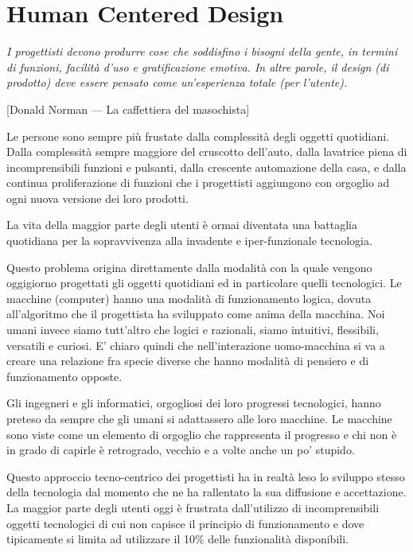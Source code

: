 \chapter{Human Centered Design}

\textit{I progettisti devono produrre cose che soddisfino i bisogni della gente, in termini di funzioni, facilità d’uso e gratificazione emotiva. In altre parole, il design (di prodotto) deve essere pensato come un’esperienza totale (per l'utente).} 

[Donald Norman — La caffettiera del masochista]

Le persone sono sempre più frustate dalla complessità degli oggetti quotidiani. Dalla complessità sempre maggiore del cruscotto dell'auto, dalla lavatrice piena di incomprensibili funzioni e pulsanti, dalla crescente automazione della casa, e dalla continua proliferazione di funzioni che i progettisti aggiungono con orgoglio ad ogni nuova versione dei loro prodotti.

La vita della maggior parte degli utenti è ormai diventata una battaglia quotidiana per la sopravvivenza alla invadente e iper-funzionale tecnologia. %

Questo problema origina direttamente dalla modalità con la quale vengono oggigiorno progettati gli oggetti quotidiani ed in particolare quelli tecnologici. Le macchine (computer) hanno una modalità di funzionamento logica, dovuta all'algoritmo che il progettista ha sviluppato come anima della macchina. Noi umani invece siamo tutt'altro che logici e razionali, siamo intuitivi, flessibili, versatili e curiosi. E' chiaro quindi che nell'interazione uomo-macchina si va a creare una relazione fra specie diverse che hanno modalità di pensiero e di funzionamento opposte.

Gli ingegneri e gli informatici, orgogliosi dei loro progressi tecnologici, hanno preteso da sempre che gli umani si adattassero alle loro macchine. Le macchine sono viste come un elemento di orgoglio che rappresenta il progresso e chi non è in grado di capirle è retrogrado, vecchio e a volte anche un po' stupido.

Questo approccio tecno-centrico dei progettisti ha in realtà leso lo sviluppo stesso della tecnologia dal momento che ne ha rallentato la sua diffusione e accettazione.
La maggior parte degli utenti oggi è frustrata dall'utilizzo di incomprensibili oggetti tecnologici di cui non capisce il principio di funzionamento e dove tipicamente si limita ad utilizzare il 10\% delle funzionalità disponibili.

